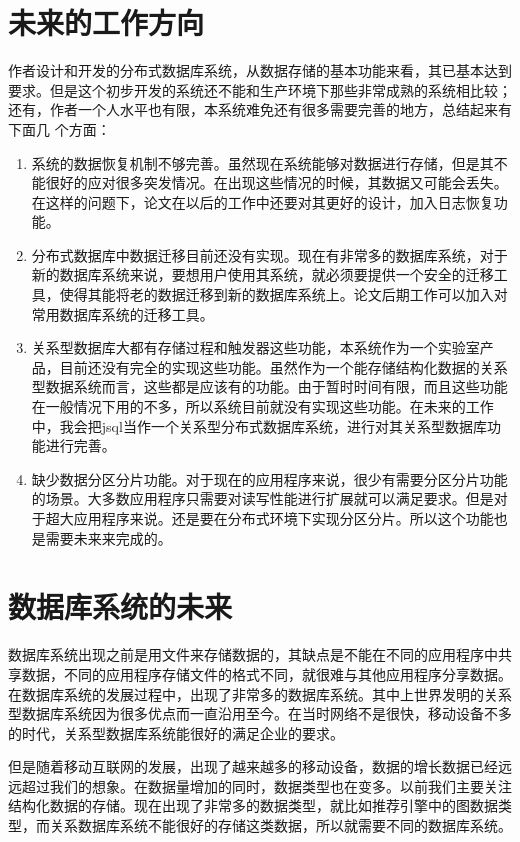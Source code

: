 \section{未来的工作方向}
作者设计和开发的分布式数据库系统，从数据存储的基本功能来看，其已基本达到要求。但是这个初步开发的系统还不能和生产环境下那些非常成熟的系统相比较；
还有，作者一个人水平也有限，本系统难免还有很多需要完善的地方，总结起来有下面几
个方面：

\begin{enumerate}[fullwidth,itemindent=2em]
	\item 系统的数据恢复机制不够完善。虽然现在系统能够对数据进行存储，但是其不能很好的应对很多突发情况。在出现这些情况的时候，其数据又可能会丢失。在这样的问题下，论文在以后的工作中还要对其更好的设计，加入日志恢复功能。
	\item 分布式数据库中数据迁移目前还没有实现。现在有非常多的数据库系统，对于新的数据库系统来说，要想用户使用其系统，就必须要提供一个安全的迁移工具，使得其能将老的数据迁移到新的数据库系统上。论文后期工作可以加入对常用数据库系统的迁移工具。
	\item 关系型数据库大都有存储过程和触发器这些功能，本系统作为一个实验室产品，目前还没有完全的实现这些功能。虽然作为一个能存储结构化数据的关系型数据系统而言，这些都是应该有的功能。由于暂时时间有限，而且这些功能在一般情况下用的不多，所以系统目前就没有实现这些功能。在未来的工作中，我会把jsql当作一个关系型分布式数据库系统，进行对其关系型数据库功能进行完善。
	\item 缺少数据分区分片功能。对于现在的应用程序来说，很少有需要分区分片功能的场景。大多数应用程序只需要对读写性能进行扩展就可以满足要求。但是对于超大应用程序来说。还是要在分布式环境下实现分区分片。所以这个功能也是需要未来来完成的。
\end{enumerate}
\section{数据库系统的未来}
数据库系统出现之前是用文件来存储数据的，其缺点是不能在不同的应用程序中共享数据，不同的应用程序存储文件的格式不同，就很难与其他应用程序分享数据。
在数据库系统的发展过程中，出现了非常多的数据库系统。其中上世界发明的关系型数据库系统因为很多优点而一直沿用至今。在当时网络不是很快，移动设备不多的时代，关系型数据库系统能很好的满足企业的要求。

但是随着移动互联网的发展，出现了越来越多的移动设备，数据的增长数据已经远远超过我们的想象。在数据量增加的同时，数据类型也在变多。以前我们主要关注结构化数据的存储。现在出现了非常多的数据类型，就比如推荐引擎中的图数据类型，而关系数据库系统不能很好的存储这类数据，所以就需要不同的数据库系统。

